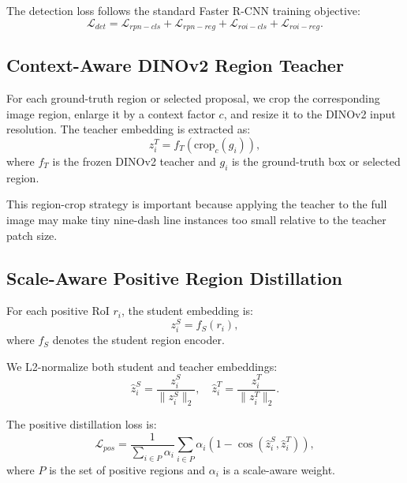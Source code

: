 \documentclass[conference,a4paper]{IEEEtran}
\begin{document}
The detection loss follows the standard Faster R-CNN training objective:
\begin{equation}
\mathcal{L}_{det}
=
\mathcal{L}_{rpn-cls}
+
\mathcal{L}_{rpn-reg}
+
\mathcal{L}_{roi-cls}
+
\mathcal{L}_{roi-reg}.
\label{eq:det_loss}
\end{equation}

\subsection{Context-Aware DINOv2 Region Teacher}

For each ground-truth region or selected proposal, we crop the corresponding image region, enlarge it by a context factor $c$, and resize it to the DINOv2 input resolution.
The teacher embedding is extracted as:
\begin{equation}
z_i^T = f_T(\text{crop}_c(g_i)),
\label{eq:teacher_embedding}
\end{equation}
where $f_T$ is the frozen DINOv2 teacher and $g_i$ is the ground-truth box or selected region.

This region-crop strategy is important because applying the teacher to the full image may make tiny nine-dash line instances too small relative to the teacher patch size.

\subsection{Scale-Aware Positive Region Distillation}

For each positive RoI $r_i$, the student embedding is:
\begin{equation}
z_i^S = f_S(r_i),
\label{eq:student_embedding}
\end{equation}
where $f_S$ denotes the student region encoder.

We L2-normalize both student and teacher embeddings:
\begin{equation}
\hat{z}_i^S = \frac{z_i^S}{\|z_i^S\|_2},
\quad
\hat{z}_i^T = \frac{z_i^T}{\|z_i^T\|_2}.
\end{equation}

The positive distillation loss is:
\begin{equation}
\mathcal{L}_{pos}
=
\frac{1}{\sum_{i \in P}\alpha_i}
\sum_{i \in P}
\alpha_i
\left(
1 -
\cos(\hat{z}_i^S,\hat{z}_i^T)
\right),
\label{eq:pos_loss}
\end{equation}
where $P$ is the set of positive regions and $\alpha_i$ is a scale-aware weight.
\end{document}
